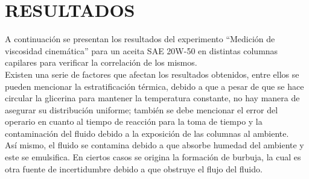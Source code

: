 \documentclass[12, letterpaper]{article}
\begin{document}
\section{RESULTADOS}

A continuación se presentan los resultados del experimento “Medición de viscosidad cinemática” para un aceita SAE 20W-50 en distintas columnas capilares para verificar la correlación de los mismos.\\
Existen una serie de factores que afectan los resultados obtenidos, entre ellos se pueden mencionar la estratificación térmica, debido a que a pesar de que se hace circular la glicerina para mantener la temperatura constante, no hay manera de asegurar su distribución uniforme; también se debe mencionar el error del operario en cuanto al tiempo de reacción para la toma de tiempo y la contaminación del fluido debido a la exposición de las columnas al ambiente.\\
Así mismo, el fluido se contamina debido a que absorbe humedad del ambiente y este se emulsifica. En ciertos casos se origina la formación de burbuja, la cual es otra fuente de incertidumbre debido a que obstruye el flujo del fluido.


\end{document}
